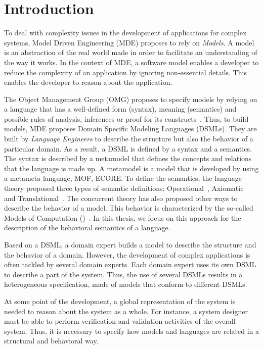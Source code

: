 \section{Introduction}
To deal with complexity issues in the development of applications for complex systems, Model Driven Engineering (MDE) proposes to rely on \emph{Models}. A model is an abstraction of the real world made in order to facilitate an understanding of the way it works. In the context of MDE, a software model enables a developer to reduce the complexity of an application by ignoring non-essential details. This enables the developer to reason about the application. 

The Object Management Group (OMG) proposes to specify models by relying on a language that has a well-defined form (syntax), meaning (semantics) and possible rules of analysis, inferences or proof for its constructs~\cite{mdaguide}. Thus, to build models, MDE proposes Domain Specific Modeling Languages (DSMLs). They are built by \emph{Language Engineers} to describe the structure but also the behavior of a particular domain. As a result, a DSML is defined by a syntax and a semantics. The syntax is described by a metamodel that defines the concepts and relations that the language is made up. A metamodel is a model that is developed by using a metameta language, \eg MOF, ECORE. To define the semantics, the language theory proposed three types of semantic definitions: Operational~\cite{operationbib}, Axiomatic~\cite{axiomaticbib} and Translational~\cite{translationalbib}. The concurrent theory has also proposed other ways to describe the behavior of a model. This behavior is characterized by the so-called Models of Computation (\mocc)~\cite{moccsemanticbib}. In this thesis, we focus on this approach for the description of the behavioral semantics of a language.


Based on a DSML, a domain expert builds a model to describe the structure and the behavior of a domain. However, the development of complex applications is often tackled by several domain experts. Each domain expert uses its own DSML to describe a part of the system. Thus, the use of several DSMLs results in a heterogeneous specification, \ie made of models that conform to different DSMLs. 

At some point of the development, a global representation of the system is needed to reason about the system as a whole. For instance, a system designer must be able to perform verification and validation activities of the overall system. Thus, it is necessary to specify how models and languages are related in a structural and behavioral way. 

